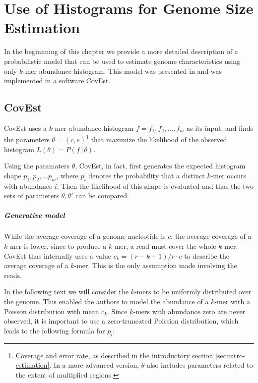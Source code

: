 \chapter{Use of Histograms for Genome Size Estimation}
\label{sec:chapter3}
In the beginnning of this chapter we provide a more detailed description of a probabilistic model
that can be used to estimate genome characteristics using only $k$-mer abundance histogram.
This model was presented in \cite{Hozza2015, Hozza2016} and was implemented in a software CovEst.

\section{CovEst}
\label{sec:covest}
CovEst uses a $k$-mer abundance histogram $f = f_1, f_2, \dots, f_m$ as its input,
and finds the parameters $\theta = (c, e)$\footnote{Coverage and error rate, as described 
in the introductory section \ref{sec:intro-estimation}. In a more advanced version, $\theta$
also includes parameters related to the extent of multiplied regions.} that maximize
the likelihood of the observed histogram $L(\theta) = P(f \,|\, \theta)$.

Using the paramaters $\theta$, CovEst, in fact, first generates the expected histogram
shape $p_1, p_2, \dots p_m$, where $p_i$ denotes the probability that a distinct $k$-mer
occurs with abundance $i$. Then the likelihood of this shape is evaluated and thus 
the two sets of parameters $\theta, \theta'$ can be compared.

\paragraph{Generative model}
While the average coverage of a genome nucleotide is $c$, the average coverage
of a $k$-mer is lower, since to produce a $k$-mer, a read must cover the whole
$k$-mer. CovEst thus internally uses a value $c_k = (r-k+1)/r \cdot c$ to describe the
average coverage of a $k$-mer. This is the only assumption made involving the reads.

In the following text we will consider the $k$-mers to be uniformly distributed
over the genome. This enabled the authors to model the abundance of a $k$-mer
with a Poisson distribution with mean $c_k$. Since $k$-mers with abundance zero are never
observed, it is important to use a zero-truncated Poission distribution, 
which leads to the following formula for $p_i$:

